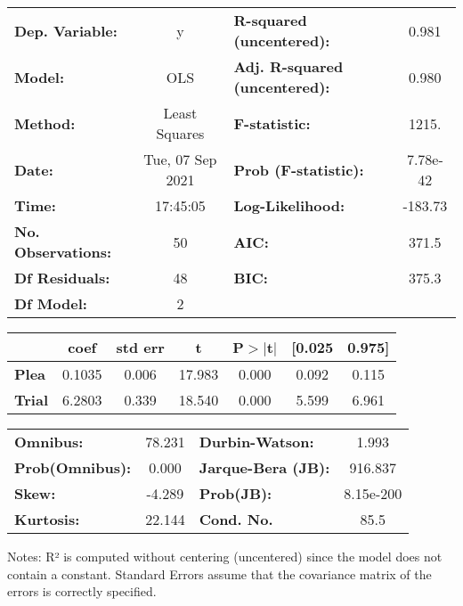 \begin{center}
\begin{tabular}{lclc}
\toprule
\textbf{Dep. Variable:}    &        y         & \textbf{  R-squared (uncentered):}      &     0.981   \\
\textbf{Model:}            &       OLS        & \textbf{  Adj. R-squared (uncentered):} &     0.980   \\
\textbf{Method:}           &  Least Squares   & \textbf{  F-statistic:       }          &     1215.   \\
\textbf{Date:}             & Tue, 07 Sep 2021 & \textbf{  Prob (F-statistic):}          &  7.78e-42   \\
\textbf{Time:}             &     17:45:05     & \textbf{  Log-Likelihood:    }          &   -183.73   \\
\textbf{No. Observations:} &          50      & \textbf{  AIC:               }          &     371.5   \\
\textbf{Df Residuals:}     &          48      & \textbf{  BIC:               }          &     375.3   \\
\textbf{Df Model:}         &           2      & \textbf{                     }          &             \\
\bottomrule
\end{tabular}
\begin{tabular}{lcccccc}
               & \textbf{coef} & \textbf{std err} & \textbf{t} & \textbf{P$> |$t$|$} & \textbf{[0.025} & \textbf{0.975]}  \\
\midrule
\textbf{Plea}  &       0.1035  &        0.006     &    17.983  &         0.000        &        0.092    &        0.115     \\
\textbf{Trial} &       6.2803  &        0.339     &    18.540  &         0.000        &        5.599    &        6.961     \\
\bottomrule
\end{tabular}
\begin{tabular}{lclc}
\textbf{Omnibus:}       & 78.231 & \textbf{  Durbin-Watson:     } &     1.993  \\
\textbf{Prob(Omnibus):} &  0.000 & \textbf{  Jarque-Bera (JB):  } &   916.837  \\
\textbf{Skew:}          & -4.289 & \textbf{  Prob(JB):          } & 8.15e-200  \\
\textbf{Kurtosis:}      & 22.144 & \textbf{  Cond. No.          } &      85.5  \\
\bottomrule
\end{tabular}
\end{center}

Notes: \newline
 [1] R² is computed without centering (uncentered) since the model does not contain a constant. \newline
 [2] Standard Errors assume that the covariance matrix of the errors is correctly specified.